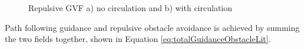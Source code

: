 \documentclass[conf]{new-aiaa}
\begin{document}
\begin{figure}[H]
	\begin{subfigmatrix}{2}%
		\centering	
		\hspace*{0mm}
	\end{subfigmatrix}
	\caption{Repulsive GVF a) no circulation and b) with circulation}
	\label{fig:decayApplied}
\end{figure} 





Path following guidance and repulsive obstacle avoidance is achieved by summing the two fields together, shown in Equation \ref{eq:totalGuidanceObstacleLit}.
\end{document}
